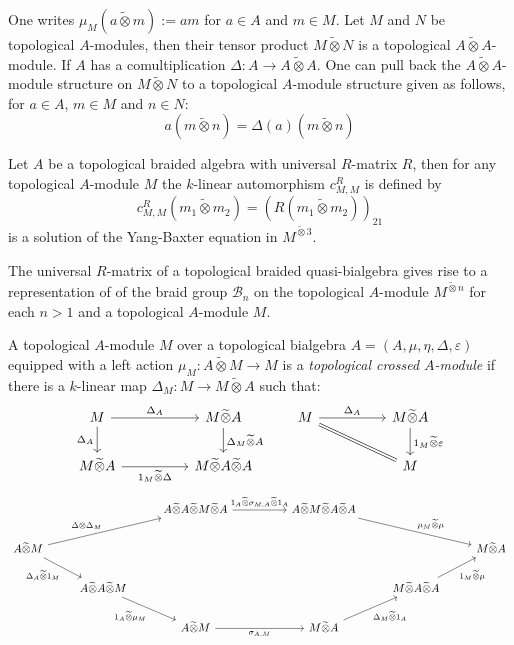 \documentclass[8pt]{article}
\theoremstyle{definition}
\theoremstyle{definition}
\theoremstyle{definition}
\theoremstyle{definition}
\theoremstyle{definition}
\theoremstyle{definition}
\theoremstyle{definition}
\theoremstyle{definition}
\theoremstyle{definition}
\theoremstyle{definition}
\theoremstyle{definition}
\theoremstyle{definition}
\theoremstyle{definition}
\theoremstyle{definition}
\theoremstyle{question}
\newcommand{\tildetimes}[0]{\widetilde{\otimes}}
\begin{document}
One writes $\mu_M (a  \tildetimes m) := am$ for $a \in A$ and $m \in M$. Let $M$ and $N$ be topological $A$-modules,
then their tensor product $M \tildetimes N$ is a topological $A \tildetimes A$-module. If $A$ has a comultiplication 
$\Delta : A \to A \tildetimes A$. One can pull back the $A \tildetimes A$-module structure on $M \tildetimes N$ to a topological
$A$-module structure given as follows, for $a \in A$, $m \in M$ and $n \in N$:
\[
a(m \tildetimes n) = \Delta(a)(m \tildetimes n)
\]

Let $A$ be a topological braided algebra with universal $R$-matrix $R$, 
then for any topological $A$-module $M$ the $k$-linear automorphism $c^{R}_{M,M}$ is defined by
\[
c^{R}_{M,M}(m_1 \tildetimes m_2) = (R(m_1 \tildetimes m_2))_{21}
\]
is a solution of the Yang-Baxter equation in $M^{\tildetimes 3}$.

The universal $R$-matrix of a topological braided quasi-bialgebra gives rise to a representation of 
of the braid group $\mathcal{B}_n$ on the topological $A$-module $M^{\tildetimes n}$ for each 
$n > 1$ and a topological $A$-module $M$.

A topological $A$-module $M$ over a topological bialgebra $A = (A, \mu, \eta, \Delta, \varepsilon)$ equipped with a left 
action $\mu_M : A \tildetimes M \to M$ is a \emph{topological crossed $A$-module} if there is a $k$-linear map 
$\Delta_M : M \to M \tildetimes A$ such that:
\[
\begin{tikzcd}
  M \ar[d, "\Delta_A"'] \ar[rr, "\Delta_A"] && M \tildetimes A \ar[d, "\Delta_M \tildetimes A"] & M \ar[rr, "\Delta_A"] \ar[drr, equal] && M \tildetimes A \ar[d, "1_M \tildetimes \varepsilon"]\\
  M \tildetimes A \ar[rr, "1_M \tildetimes \Delta"'] && M \tildetimes A \tildetimes A           & && M
\end{tikzcd}
\]
\[
\begin{tikzcd}
  && A \tildetimes A \tildetimes M \tildetimes A \ar[rr, "1_A \tildetimes \sigma_{M,A} \tildetimes 1_A"] && A \tildetimes M \tildetimes A \tildetimes A \ar[drr, "\mu_M \tildetimes \mu"] \\
  A \tildetimes M \ar[urr, "\Delta \otimes \Delta_M"] \ar[dr, "\Delta_A \tildetimes 1_M"'] &&&&&& M \tildetimes A \\
  & A \tildetimes A \tildetimes M \ar[dr, "1_A \tildetimes \mu_M"'] &&&& M \tildetimes A \tildetimes A \ar[ur, "1_M \tildetimes \mu"'] \\
  && A \tildetimes M \ar[rr, "\sigma_{A, M}"'] && M \tildetimes A \ar[ur, "\Delta_M \tildetimes 1_A"'] 
\end{tikzcd}
\]
\end{document}
